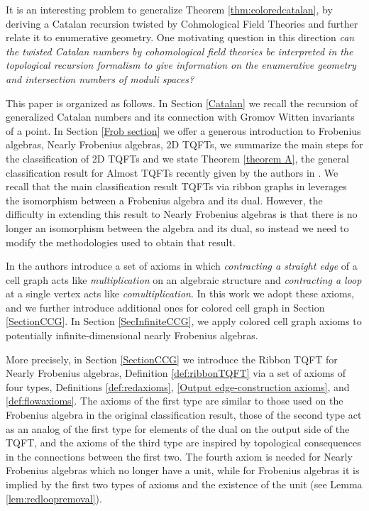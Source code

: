 \documentclass{amsart}
\theoremstyle{definition}
\begin{document}
It is an interesting problem to generalize Theorem \ref{thm:coloredcatalan}, by deriving a Catalan recursion twisted by Cohmological Field Theories and further relate it to enumerative geometry. One motivating question in this direction {\it can the twisted Catalan numbers by cohomological field theories be interpreted in the topological recursion formalism to give information on the enumerative geometry and intersection numbers of moduli spaces?}

\vskip 10pt

This paper is organized as follows. In Section \ref{Catalan} we recall the recursion of generalized Catalan numbers and its connection with Gromov Witten invariants of a point. In Section \ref{Frob section} we offer a generous introduction to Frobenius algebras, Nearly Frobenius algebras,  2D TQFTs, we summarize the main steps for the classification of 2D TQFTs and we state Theorem \ref{theorem A}, the general classification result for Almost TQFTs recently given by the authors in \cite{DaDu}. We recall that the main classification result TQFTs via ribbon graphs in \cite{DM_ribbon} leverages the isomorphism between a Frobenius algebra and its dual. However, the difficulty in extending this result to Nearly Frobenius algebras is that there is no longer an isomorphism between the algebra and its dual, so instead we need to modify the methodologies used to obtain that result.

In \cite{DM_ribbon}  the authors introduce a set of axioms in which {\it contracting a straight edge} of a cell graph acts like {\it multiplication} on an algebraic structure and {\it contracting a loop} at a single vertex acts like {\it comultiplication}. In this work we adopt these axioms, and we further introduce additional ones for colored cell graph in Section \ref{SectionCCG}. In Section \ref{SecInfiniteCCG}, we apply colored cell graph axioms to potentially infinite-dimensional nearly Frobenius algebras.

More precisely, in Section \ref{SectionCCG} we introduce the Ribbon TQFT for Nearly Frobenius algebras,  Definition \ref{def:ribbonTQFT} via a set of axioms of  four types,  Definitions \ref{def:redaxioms}, \ref{Output edge-construction axioms},  and \ref{def:flowaxioms}. The axioms of the first type are similar to those used on the Frobenius algebra in the original classification result, those of the second type act as an analog of the first type for elements of the dual on the output side of the TQFT, and the axioms of the third type are inspired by topological consequences in the connections between the first two. The fourth axiom is needed for Nearly Frobenius algebras which no longer have a unit, while for Frobenius algebras it is implied by the first two types of axioms and the existence of the unit (see Lemma \ref{lem:redloopremoval}).
\end{document}
